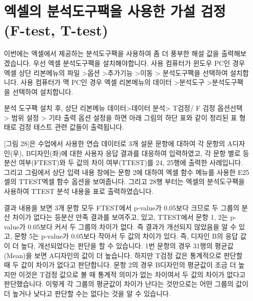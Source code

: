\documentclass[
  letterpaper,
]{book}
\begin{document}
\section{엑셀의 분석도구팩을 사용한 가설 검정 (F-test,
T-test)}\label{uxc5d1uxc140uxc758-uxbd84uxc11duxb3c4uxad6cuxd329uxc744-uxc0acuxc6a9uxd55c-uxac00uxc124-uxac80uxc815-f-test-t-test}

이번에는 엑셀에서 제공하는 분석도구팩을 사용하여 좀 더 풍부한 해설 값을
출력해보겠습니다. 우선 엑셀 분석도구팩을 설치해야합니다. 사용 컴퓨터가
윈도우 PC인 경우 엑셀 상단 리본메뉴의 파일 \textgreater 옵션
\textgreater 추가기능 \textgreater 이동 \textgreater{} 분석도구팩을
선택하여 설치합니다. 사용 컴퓨터가 맥 PC인 경우 엑셀 리본메뉴의 데이터
\textgreater 분석도구 \textgreater 분석도구팩을 선택하여 설치합니다.

분석 도구팩 설치 후, 상단 리본메뉴 데이터\textgreater 데이터
분석\textgreater{} T검정/ F 검정 옵션선택 \textgreater{} 범위 설정
\textgreater{} 기타 출력 옵션 설정을 하면 아래 그림의 하단 표와 같이
정리된 표 형태로 검정 테스트 관련 값들이 출력됩니다.

{[}그림 28{]}은 수업에서 사용한 연습 데이터로 3개 설문 문항에 대하여 각
문항의 A디자인(우), B디자인(좌)에 대한 사용자 응답 결과를 대응하여
입력하였고, 각 문항 별로 등분산 여부(FTEST)와 두 값의 차이 여부(TTEST)를
24, 25행에 출력한 사례입니다. 그리고 그림에서 상단 입력 내용 창에는 문항
2에 대하여 엑셀 함수 메뉴를 사용한 E25셀의 TTEST엑셀 함수 옵션을
보여줍니다. 그리고 28행 부터는 엑셀의 분석도구팩을 사용하여 TTEST 분석
내용을 표로 출력하였습니다.

결과 내용을 보면 3개 문항 모두 FTEST에서 p-value가 0.05보다 크므로 두
그룹의 분산 차이가 없다는 등분산 만족 결과를 보여주고, 있고, TTEST에서
문항 1, 2는 p-value가 0.05보다 커서 두 그룹의 차이가 없다. 즉 결과가
개선되지 않았음을 알 수 있고, 문항 5는 p-value가 0.05보다 작아서 두 값의
차이가 있다. 즉, 디자인 B의 응답 값이 더 높다, 개선되었다는 판단을 할 수
있습니다. 1번 문항의 경우 31행의 평균값(Mean)을 보면 A디자인의 값이 더
높습니다. 하지만 T검정 값은 통계적으로 판단할 때 두 값이 차이가 없다고
판단합니다. 문항 2의 경우 B디자인의 평균값이 조금 더 높지만 이것은 T검정
값으로 볼 때 통계적 의미가 없는 차이여서 두 값의 차이가 없다고
판단했습니다. 이렇게 각 그룹의 평균값이 차이가 난다는 것만으로는 어떤
그룹의 값이 더 높거나 낮다고 판단할 수는 없다는 것을 알 수 있습니다.
\end{document}
